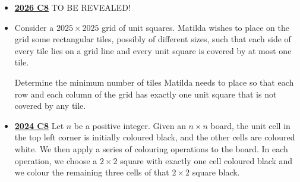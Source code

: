 \documentclass[11pt]{scrartcl}
\begin{document}
\begin{itemize}[leftmargin=*]

\item \href{https://www.imo-official.org/assets/documents/problems/2026/IMO2026SL.pdf}{\textbf{2026 C8}} TO BE REVEALED!

\item {} Consider a $2025\times2025$ grid of unit squares. Matilda wishes to place on the grid some rectangular tiles, possibly of different sizes, such that each side of every tile lies on a grid line and every unit square is covered by at most one tile.

Determine the minimum number of tiles Matilda needs to place so that each row and each column of the grid has exactly one unit square that is not covered by any tile. 
\item \href{https://artofproblemsolving.com/community/c6h3610448p35340921}{\textbf{2024 C8}} Let $n$ be a positive integer. Given an $n\times n$ board, the unit cell in the top left corner is initially coloured black, and the other cells are coloured white. We then apply a series of colouring operations to the board. In each operation, we choose a $2\times 2$ square with exactly one cell coloured black and we colour the remaining three cells of that $2\times 2$ square black.


\end{itemize}
\end{document}
